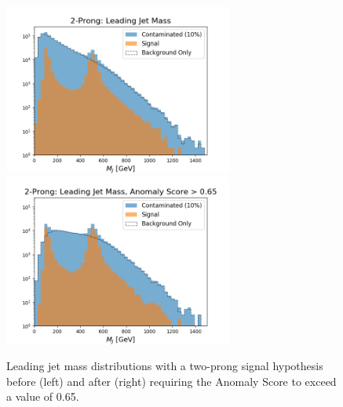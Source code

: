 \documentclass[11pt, a4paper]{article}
\begin{document}
\begin{figure}[H]
	\begin{center}
		\includegraphics[width=213pt]{imgs/2Prong_Contaminated_10p0_J_Mass_Multi_Lead_SaveForPaper.png}
		\includegraphics[width=213pt]{imgs/2Prong_Contaminated_10p0_J_Mass_AnomScore0p65_Multi_Lead_SaveForPaper.png}
	\end{center}
	\caption{Leading jet mass distributions with a two-prong signal hypothesis before (left) and after (right) requiring the Anomaly Score to exceed a value of 0.65.}
	\label{fig:2P_lj_mass}
\end{figure}
\end{document}

